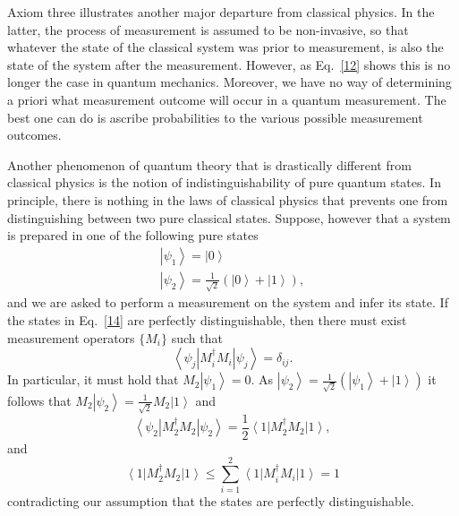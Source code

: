 \documentclass{article}
\newcommand{\ket}[1]{\left|#1\right\rangle}
\newcommand{\bra}[1]{\left\langle #1\right|}
\begin{document}
Axiom three illustrates another major departure from classical physics. In the latter, the process of measurement is assumed to be non-invasive, so that whatever the state of the classical system was prior to measurement, is also the state of the system after the measurement.  However, as Eq.~\eqref{12} shows this is no longer the case in quantum mechanics.  Moreover, we have no way of determining a priori what measurement outcome will occur in a quantum measurement.  The best one can do is ascribe probabilities to the various possible measurement outcomes.

Another phenomenon of quantum theory that is drastically different from classical physics is the notion of indistinguishability of pure quantum states.  In principle, there is nothing in the laws of classical physics that prevents one from distinguishing between two pure classical states.  Suppose, however that a system is prepared in one of the following pure states
\begin{align}\nonumber
\ket{\psi_1}=\ket{0}\\
\ket{\psi_2}=\frac{1}{\sqrt{2}}(\ket{0}+\ket{1}),
\label{14}
\end{align}  
and we are asked to perform a measurement on the system and infer its state.  If the states in Eq.~\eqref{14} are perfectly distinguishable, then there must exist measurement operators $\{M_i\}$ such that 
\begin{equation}
\bra{\psi_j}M_i^\dagger M_i\ket{\psi_j}=\delta_{ij}.
\label{15}
\end{equation}
In particular, it must hold that $M_2\ket{\psi_1}=0$.  As $\ket{\psi_2}=\frac{1}{\sqrt{2}}(\ket{\psi_1}+\ket{1})$ it follows that $M_2\ket{\psi_2}=\frac{1}{\sqrt{2}}M_2\ket{1}$ and 
\begin{equation}
\bra{\psi_2}M_2^\dagger M_2\ket{\psi_2}=\frac{1}{2} \bra{1}M_2^\dagger M_2\ket{1},
\label{16}
\end{equation}
and 
\begin{equation}
\bra{1}M_2^\dagger M_2\ket{1}\leq\sum_{i=1}^2\bra{1}M_i^\dagger M_i\ket{1}=1
\label{17}
\end{equation}
contradicting our assumption that the states are perfectly distinguishable.  
\end{document}
